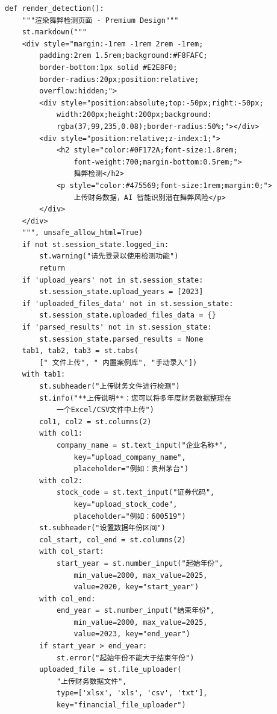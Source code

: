 \documentclass[a4paper,10pt]{article}
\begin{document}
\begin{lstlisting}
def render_detection():
    """渲染舞弊检测页面 - Premium Design"""
    st.markdown("""
    <div style="margin:-1rem -1rem 2rem -1rem;
        padding:2rem 1.5rem;background:#F8FAFC;
        border-bottom:1px solid #E2E8F0;
        border-radius:20px;position:relative;
        overflow:hidden;">
        <div style="position:absolute;top:-50px;right:-50px;
            width:200px;height:200px;background:
            rgba(37,99,235,0.08);border-radius:50%;"></div>
        <div style="position:relative;z-index:1;">
            <h2 style="color:#0F172A;font-size:1.8rem;
                font-weight:700;margin-bottom:0.5rem;">
                舞弊检测</h2>
            <p style="color:#475569;font-size:1rem;margin:0;">
                上传财务数据，AI 智能识别潜在舞弊风险</p>
        </div>
    </div>
    """, unsafe_allow_html=True)
    if not st.session_state.logged_in:
        st.warning("请先登录以使用检测功能")
        return
    if 'upload_years' not in st.session_state:
        st.session_state.upload_years = [2023]
    if 'uploaded_files_data' not in st.session_state:
        st.session_state.uploaded_files_data = {}
    if 'parsed_results' not in st.session_state:
        st.session_state.parsed_results = None
    tab1, tab2, tab3 = st.tabs(
        [" 文件上传", " 内置案例库", "手动录入"])
    with tab1:
        st.subheader("上传财务文件进行检测")
        st.info("**上传说明**：您可以将多年度财务数据整理在
            一个Excel/CSV文件中上传")
        col1, col2 = st.columns(2)
        with col1:
            company_name = st.text_input("企业名称*",
                key="upload_company_name",
                placeholder="例如：贵州茅台")
        with col2:
            stock_code = st.text_input("证券代码",
                key="upload_stock_code",
                placeholder="例如：600519")
        st.subheader("设置数据年份区间")
        col_start, col_end = st.columns(2)
        with col_start:
            start_year = st.number_input("起始年份",
                min_value=2000, max_value=2025,
                value=2020, key="start_year")
        with col_end:
            end_year = st.number_input("结束年份",
                min_value=2000, max_value=2025,
                value=2023, key="end_year")
        if start_year > end_year:
            st.error("起始年份不能大于结束年份")
        uploaded_file = st.file_uploader(
            "上传财务数据文件",
            type=['xlsx', 'xls', 'csv', 'txt'],
            key="financial_file_uploader")

\end{lstlisting}
\end{document}
